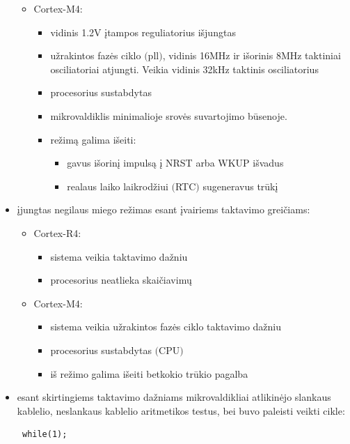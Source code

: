 \documentclass[a4paper, 12pt]{article} %
\begin{document}
\begin{onehalfspacing}
\begin{itemize}
\begin{itemize}
\item Cortex-M4:
\begin{itemize}
\item vidinis 1.2V \k{i}tampos reguliatorius i\v{s}jungtas
\item u\v{z}rakintos faz\.es ciklo $($pll$)$, vidinis 16MHz ir i\v{s}orinis 8MHz taktiniai osciliatoriai atjungti. Veikia vidinis 32kHz taktinis osciliatorius
\item procesorius sustabdytas
\item mikrovaldiklis minimalioje srov\.es suvartojimo b\=usenoje.
\item re\v{z}im\k{a} galima i\v{s}eiti:
\begin{itemize} 
\item gavus i\v{s}orin\k{i} impuls\k{a} \k{i} NRST arba WKUP i\v{s}vadus 
\item realaus laiko laikrod\v{z}iui $($RTC$)$ sugeneravus tr\=uk\k{i}
\end{itemize} 
\end{itemize}
\end{itemize}
\item \k{i}jungtas negilaus miego re\v{z}imas esant \k{i}vairiems taktavimo grei\v{c}iams:
\begin{itemize} %
\item Cortex-R4:
\begin{itemize}
\item sistema veikia taktavimo da\v{z}niu
\item procesorius neatlieka skai\v{c}iavim\k{u}
\end{itemize}
\item Cortex-M4:
\begin{itemize}
\item sistema veikia u\v{z}rakintos faz\.es ciklo taktavimo da\v{z}niu
\item procesorius sustabdytas $($CPU$)$
\item i\v{s} re\v{z}imo galima i\v{s}eiti betkokio tr\=ukio pagalba
\end{itemize}
\end{itemize}
\item esant skirtingiems taktavimo da\v{z}niams mikrovaldikliai atlikin\.ejo slankaus kablelio, neslankaus kablelio aritmetikos testus, bei buvo paleisti veikti cikle: \begin{verbatim} while(1); \end{verbatim} 
\end{itemize}


\end{onehalfspacing}
\end{document}
